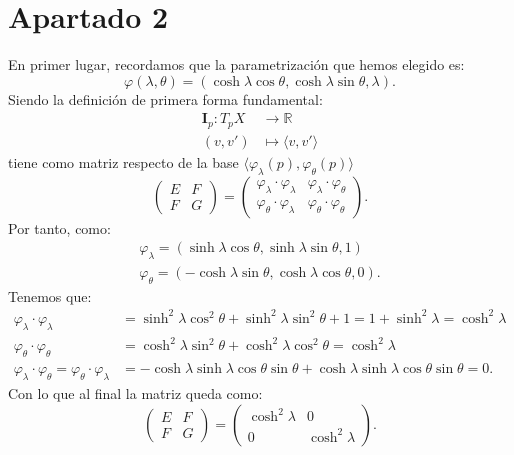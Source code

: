 \section{Apartado 2}
En primer lugar, recordamos que la parametrización que hemos elegido es:
\[
\varphi\left( \lambda, \theta \right) = \left( \cosh \lambda \cos \theta,
\cosh \lambda \sin \theta, \lambda \right).
\]
Siendo la definición de primera forma fundamental:
\begin{align*}
    \mathbf{I}_p: T_pX &\rightarrow \mathbb{R}\\
    \left( v, v' \right) &\mapsto \langle v, v' \rangle
\end{align*}
tiene como matriz respecto de la base $\langle \varphi_{\lambda}\left( p \right),
\varphi_{\theta}\left( p \right) \rangle$
\[
    \begin{pmatrix} E & F\\ F & G \end{pmatrix} = \begin{pmatrix} 
    \varphi_{\lambda} \cdot \varphi_{\lambda} & \varphi_{\lambda} \cdot \varphi_{\theta}\\
    \varphi_{\theta} \cdot \varphi_{\lambda} & \varphi_{\theta} \cdot
    \varphi_{\theta}
    \end{pmatrix}.
\]
Por tanto, como:
\begin{gather*}
    \varphi_{\lambda} = \left( \sinh \lambda \cos \theta, \sinh \lambda \sin
    \theta, 1 \right)\\
    \varphi_{\theta} = \left( -\cosh \lambda \sin \theta, \cosh \lambda \cos
    \theta, 0 \right).
\end{gather*}
Tenemos que:
\begin{align*}
    \varphi_{\lambda} \cdot \varphi_{\lambda} &= \sinh^2 \lambda \cos^2 \theta +
    \sinh^2 \lambda \sin^2 \theta + 1 = 1 + \sinh^2 \lambda = \cosh^2 \lambda\\
    \varphi_{\theta} \cdot \varphi_{\theta} &= \cosh^2 \lambda \sin^2 \theta +
    \cosh^2 \lambda \cos^2 \theta = \cosh^2 \lambda\\
    \varphi_{\lambda} \cdot \varphi_{\theta} = \varphi_{\theta} \cdot
    \varphi_{\lambda} &= -\cosh \lambda \sinh \lambda \cos \theta \sin \theta +
    \cosh \lambda \sinh \lambda \cos \theta \sin \theta = 0.
\end{align*}
Con lo que al final la matriz queda como:
\[
    \begin{pmatrix} E & F\\ F & G \end{pmatrix} = \begin{pmatrix} 
    \cosh^2 \lambda & 0\\
    0 & \cosh^2 \lambda
    \end{pmatrix}.
\]
